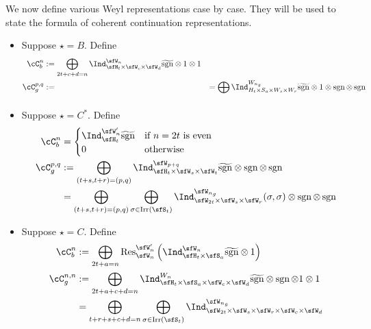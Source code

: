 \documentclass[12pt,a4paper]{amsart}
\newcommand{\Res}{\mathrm{Res}}
\newcommand{\sgn}{\operatorname{sgn}}
\numberwithin{equation}{section}
\theoremstyle{remark}
\def\Irr{\mathrm{Irr}}
\def\Cint#1{\Coh_{[#1]}}
\def\Coh{\mathrm{Coh}}
\def\hsgn{\widetilde{\mathrm{sgn}}}
\begin{document}
We now define various Weyl representations case by case.
They will be used to state the formula of coherent continuation representations.
\begin{itemize}
  \item Suppose $\star= B$. Define
  \[
    \begin{split}
      \cC_b^{n} & :=\bigoplus_{\substack{2t+c+d=n}}
        \Ind_{\sfH_{t} \times \sfW_{c}\times \sfW_{d}}^{\sfW_{n}}
        \hsgn\otimes 1\otimes 1 \\
      \cC_g^{p,q} &:=
      &=\bigoplus_{\substack{}} \Ind_{H_{t} \times S_{a}\times W_s\times W_r}^{W_{n_{g}}}
      \hsgn \otimes 1 \otimes \sgn \otimes \sgn \\
    \end{split}
  \]
  \item Suppose $\star=C^{*}$. Define
  \[
    \begin{split}
      \cC_b^{n} & =
      \begin{cases}
        \Ind_{\sfH_{t}}^{\sfW'_{n}} \hsgn &
        \text{if $n=2t$ is even} \\
        0 & \text{otherwise}\\
      \end{cases}\\
      \cC_g^{p,q} %
      &:=\bigoplus_{\substack{(t+s,t+r)=(p,q)}} \Ind_{\sfH_{t} \times \sfW_s\times \sfW_t}^{\sfW_{p+q}}
      \hsgn \otimes \sgn \otimes \sgn \\
      & =\bigoplus_{\substack{(t+s,t+r)=(p,q)}} \bigoplus_{\sigma\in \Irr(\sfS_{t})} \Ind_{\sfW_{2t}\times \sfW_s\times \sfW_r}^{\sfW_{n_{g}}}
      (\sigma,\sigma)\otimes \sgn \otimes \sgn \\
    \end{split}
  \]
  \item Suppose $\star=C$. Define
  \[
    \begin{split}
      \cC_b^{n} & :=\bigoplus_{\substack{2t+a=n}}
      \Res_{\sfW_{n}}^{\sfW'_{n}}
      \left(
        \Ind_{\sfH_{t} \times \sfS_a}^{\sfW_{n}}
        \hsgn\otimes 1\right) \\
      \cC_g^{n,n} &:=
      \bigoplus_{2t+a+c+d=n}\Ind_{\sfH_{t} \times \sfS_{a}
        \times \sfW_c\times \sfW_d}^{W_{n}} \hsgn \otimes
      \sgn \otimes 1 \otimes 1\\
      & =\bigoplus_{\substack{t+r+s+c+d=n}} \bigoplus_{\sigma\in \Irr(\sfS_{t})} \Ind_{\sfW_{2t}\times \sfW_s\times \sfW_r\times \sfW_{c}\times \sfW_{d}}^{\sfW_{n_{g}}}

\end{split}\]
\end{itemize}
\end{document}
